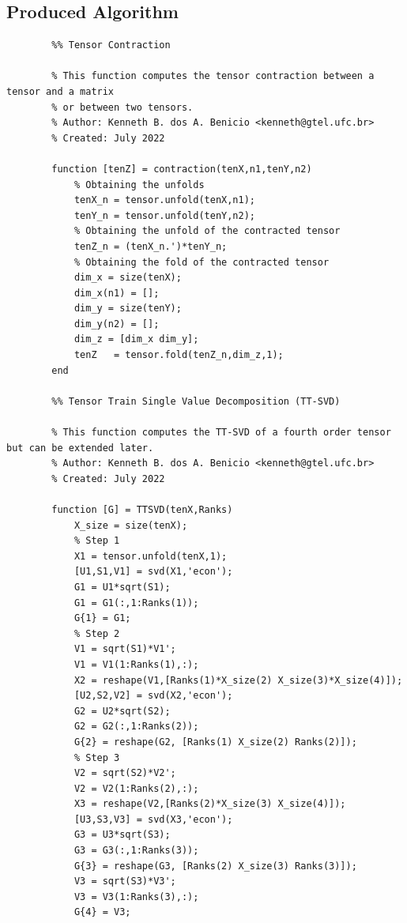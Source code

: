 \documentclass[a4paper,10pt]{article}
\begin{document}
    \newpage
    \subsection*{Produced Algorithm}

    \begin{verbatim}
        %% Tensor Contraction

        % This function computes the tensor contraction between a tensor and a matrix
        % or between two tensors.  
        % Author: Kenneth B. dos A. Benicio <kenneth@gtel.ufc.br>
        % Created: July 2022

        function [tenZ] = contraction(tenX,n1,tenY,n2)
            % Obtaining the unfolds
            tenX_n = tensor.unfold(tenX,n1);
            tenY_n = tensor.unfold(tenY,n2);
            % Obtaining the unfold of the contracted tensor
            tenZ_n = (tenX_n.')*tenY_n;
            % Obtaining the fold of the contracted tensor
            dim_x = size(tenX);
            dim_x(n1) = [];
            dim_y = size(tenY);
            dim_y(n2) = [];
            dim_z = [dim_x dim_y];
            tenZ   = tensor.fold(tenZ_n,dim_z,1);
        end

        %% Tensor Train Single Value Decomposition (TT-SVD)

        % This function computes the TT-SVD of a fourth order tensor but can be extended later.   
        % Author: Kenneth B. dos A. Benicio <kenneth@gtel.ufc.br>
        % Created: July 2022

        function [G] = TTSVD(tenX,Ranks)
            X_size = size(tenX);
            % Step 1
            X1 = tensor.unfold(tenX,1);
            [U1,S1,V1] = svd(X1,'econ');
            G1 = U1*sqrt(S1);
            G1 = G1(:,1:Ranks(1));
            G{1} = G1;
            % Step 2
            V1 = sqrt(S1)*V1';
            V1 = V1(1:Ranks(1),:);
            X2 = reshape(V1,[Ranks(1)*X_size(2) X_size(3)*X_size(4)]);
            [U2,S2,V2] = svd(X2,'econ');
            G2 = U2*sqrt(S2);
            G2 = G2(:,1:Ranks(2));
            G{2} = reshape(G2, [Ranks(1) X_size(2) Ranks(2)]);
            % Step 3
            V2 = sqrt(S2)*V2';
            V2 = V2(1:Ranks(2),:);
            X3 = reshape(V2,[Ranks(2)*X_size(3) X_size(4)]);
            [U3,S3,V3] = svd(X3,'econ');
            G3 = U3*sqrt(S3);
            G3 = G3(:,1:Ranks(3));
            G{3} = reshape(G3, [Ranks(2) X_size(3) Ranks(3)]);
            V3 = sqrt(S3)*V3';
            V3 = V3(1:Ranks(3),:);
            G{4} = V3;


\end{verbatim}
\end{document}

